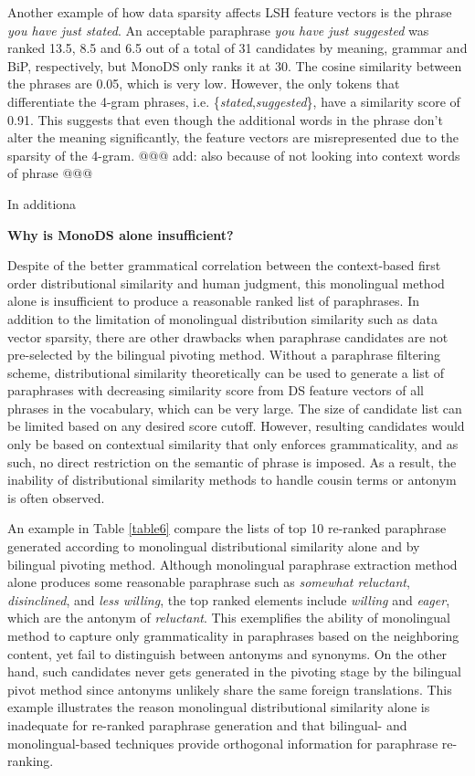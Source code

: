 \documentclass[11pt]{article}
\begin{document}
Another example of how data sparsity affects LSH feature vectors is the phrase \emph{you have just stated}. An acceptable paraphrase \emph{you have just suggested} was ranked 13.5, 8.5 and 6.5 out of a total of 31 candidates by meaning, grammar and BiP, respectively, but MonoDS only ranks it at 30. The cosine similarity between the phrases are 0.05, which is very low. However, the only tokens that differentiate the 4-gram phrases, i.e. \{\emph{stated},\emph{suggested}\}, have a similarity score of 0.91. This suggests that even though the additional words in the phrase don't alter the meaning significantly, the feature vectors are misrepresented due to the sparsity of the 4-gram. @@@ add: also because of not looking into context words of phrase @@@

In additiona

{\bf Why is MonoDS alone insufficient?}

Despite of the better grammatical correlation between the context-based first order distributional similarity and human judgment, this monolingual method alone is insufficient to produce a reasonable ranked list of paraphrases. In addition to the limitation of monolingual distribution similarity such as data vector sparsity, there are other drawbacks when paraphrase candidates are not pre-selected by the bilingual pivoting method. Without a paraphrase filtering scheme, distributional similarity theoretically can be used to generate a list of paraphrases with decreasing similarity score from DS feature vectors of all phrases in the vocabulary, which can be very large. The size of candidate list can be limited based on any desired score cutoff. However, resulting candidates would only be based on contextual similarity that only enforces grammaticality, and as such, no direct restriction on the semantic of phrase is imposed. As a result, the inability of distributional similarity methods to handle cousin terms or antonym is often observed. 

An example in Table \ref{table6} compare the lists of top 10 re-ranked paraphrase generated according to monolingual distributional similarity alone and by bilingual pivoting method. Although monolingual paraphrase extraction method alone produces some reasonable paraphrase such as \emph{somewhat reluctant}, \emph{disinclined}, and \emph{less willing}, the top ranked elements include \emph{willing} and \emph{eager}, which are the antonym of \emph{reluctant}. This exemplifies the ability of monolingual method to capture only grammaticality in paraphrases based on the neighboring content, yet fail to distinguish between antonyms and synonyms. On the other hand, such candidates never gets generated in the pivoting stage by the bilingual pivot method since antonyms unlikely share the same foreign translations. This example illustrates the reason monolingual distributional similarity alone is inadequate for re-ranked paraphrase generation and that bilingual- and monolingual-based techniques provide orthogonal information for paraphrase re-ranking. 
\end{document}
